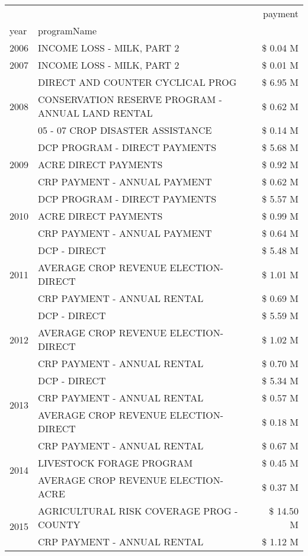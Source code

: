 \begin{tabular}{llr}
\toprule
 &  & payment \\
year & programName &  \\
\midrule
2006 & INCOME LOSS - MILK, PART 2 & \$ 0.04 M \\
\cline{1-3}
2007 & INCOME LOSS - MILK, PART 2 & \$ 0.01 M \\
\cline{1-3}
\multirow[t]{3}{*}{2008} & DIRECT AND COUNTER CYCLICAL PROG & \$ 6.95 M \\
 & CONSERVATION RESERVE PROGRAM - ANNUAL LAND RENTAL & \$ 0.62 M \\
 & 05 - 07 CROP DISASTER ASSISTANCE & \$ 0.14 M \\
\cline{1-3}
\multirow[t]{3}{*}{2009} & DCP PROGRAM - DIRECT PAYMENTS & \$ 5.68 M \\
 & ACRE DIRECT PAYMENTS & \$ 0.92 M \\
 & CRP PAYMENT - ANNUAL PAYMENT & \$ 0.62 M \\
\cline{1-3}
\multirow[t]{3}{*}{2010} & DCP PROGRAM - DIRECT PAYMENTS & \$ 5.57 M \\
 & ACRE DIRECT PAYMENTS & \$ 0.99 M \\
 & CRP PAYMENT - ANNUAL PAYMENT & \$ 0.64 M \\
\cline{1-3}
\multirow[t]{3}{*}{2011} & DCP - DIRECT & \$ 5.48 M \\
 & AVERAGE CROP REVENUE ELECTION-DIRECT & \$ 1.01 M \\
 & CRP PAYMENT - ANNUAL RENTAL & \$ 0.69 M \\
\cline{1-3}
\multirow[t]{3}{*}{2012} & DCP - DIRECT & \$ 5.59 M \\
 & AVERAGE CROP REVENUE ELECTION-DIRECT & \$ 1.02 M \\
 & CRP PAYMENT - ANNUAL RENTAL & \$ 0.70 M \\
\cline{1-3}
\multirow[t]{3}{*}{2013} & DCP - DIRECT & \$ 5.34 M \\
 & CRP PAYMENT - ANNUAL RENTAL & \$ 0.57 M \\
 & AVERAGE CROP REVENUE ELECTION-DIRECT & \$ 0.18 M \\
\cline{1-3}
\multirow[t]{3}{*}{2014} & CRP PAYMENT - ANNUAL RENTAL & \$ 0.67 M \\
 & LIVESTOCK FORAGE PROGRAM & \$ 0.45 M \\
 & AVERAGE CROP REVENUE ELECTION-ACRE & \$ 0.37 M \\
\cline{1-3}
\multirow[t]{3}{*}{2015} & AGRICULTURAL RISK COVERAGE PROG - COUNTY & \$ 14.50 M \\
 & CRP PAYMENT - ANNUAL RENTAL & \$ 1.12 M \\

\end{tabular}
